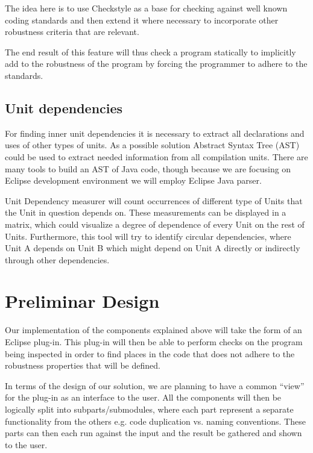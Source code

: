     The idea here is to use Checkstyle as a base for checking against well known coding standards and then extend it where necessary to incorporate other robustness criteria that are relevant. 

    The end result of this feature will thus check a program statically to implicitly add to the robustness of the program by forcing the programmer to adhere to the standards.

  \subsection{Unit dependencies}
    For finding inner unit dependencies it is necessary to extract all declarations and uses of other types of units. As a possible solution Abstract Syntax Tree (AST) could be used to extract needed information from all compilation units. There are many tools to build an AST of Java code, though because we are focusing on Eclipse development environment we will employ Eclipse Java parser.

    Unit Dependency measurer will count occurrences of different type of Units that the Unit in question depends on. These measurements can be displayed in a matrix, which could visualize a degree of dependence of every Unit on the rest of Units. Furthermore, this tool will try to identify circular dependencies, where Unit A depends on Unit B which might depend on Unit A directly or indirectly through other dependencies.

\section{Preliminar Design}
  Our implementation of the components explained above will take the form of an Eclipse plug-in. This plug-in will then be able to perform checks on the program being inspected in order to find places in the code that does not adhere to the robustness properties that will be defined. 

  In terms of the design of our solution, we are planning to have a common “view” for the plug-in as an interface to the user. All the components will then be logically split into subparts/submodules, where each part represent a separate functionality from the others e.g. code duplication vs. naming conventions. These parts can then each run against the input and the result be gathered and shown to the user.